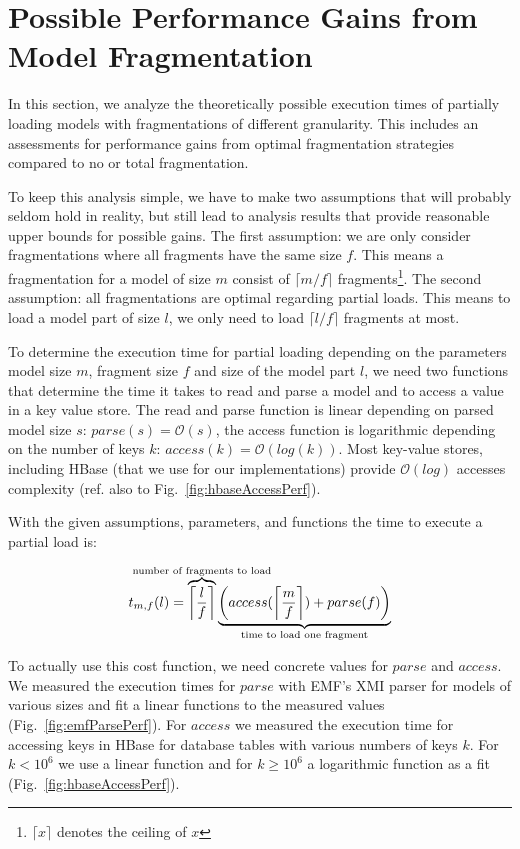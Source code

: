 \section{Possible Performance Gains from Model Fragmentation}
\label{sec:gains}

In this section, we analyze the theoretically possible execution times of partially loading models with fragmentations of different granularity. This includes an assessments for performance gains from optimal fragmentation strategies compared to no or total fragmentation.

To keep this analysis simple, we have to make two assumptions that will probably seldom hold in reality, but still lead to analysis results that provide reasonable upper bounds for possible gains.
The first assumption: we are only consider fragmentations where all fragments have the same size $f$. 
This means a fragmentation for a model of size $m$ consist of $\lceil m/f \rceil$ fragments\footnote{$\lceil x\rceil$ denotes the ceiling of $x$}. 
The second assumption: all fragmentations are optimal regarding partial loads. This means to load a model part of size $l$, we only need to load $\lceil l/f\rceil$ fragments at most.

To determine the execution time for partial loading depending on the parameters model size $m$, fragment size $f$ and size of the model part $l$, we need two functions that determine the time it takes to read and parse a model and to access a value in a key value store. The read and parse function is linear depending on parsed model size $s$: $parse(s)=\mathcal{O}\left(s\right)$, the access function is logarithmic depending on the number of keys $k$: $access(k)=\mathcal{O}(log(k))$. Most key-value stores, including HBase (that we use for our implementations) provide $\mathcal{O}(log)$ accesses complexity (ref. also to Fig.~\ref{fig:hbaseAccessPerf}).

With the given assumptions, parameters, and functions the time to execute a partial load is:

$$t_{m,f}(l)=\overbrace{\left\lceil\frac{l}{f}\right\rceil}^{\mathclap{\text{number of fragments to load}}}\underbrace{\left(access(\left\lceil\frac{m}{f}\right\rceil) + parse(f)\right)}_{\mathclap{\text{time to load one fragment}}}$$

To actually use this cost function, we need concrete values for $parse$ and $access$. We measured the execution times for $parse$ with EMF's XMI parser for models of various sizes and fit a linear functions to the measured values (Fig.~\ref{fig:emfParsePerf}). For $access$ we measured the execution time for accessing keys in HBase for database tables with various numbers of keys $k$. For $k<10^6$ we use a linear function and for $k\ge 10^6$ a logarithmic function as a fit (Fig.~\ref{fig:hbaseAccessPerf}). 

